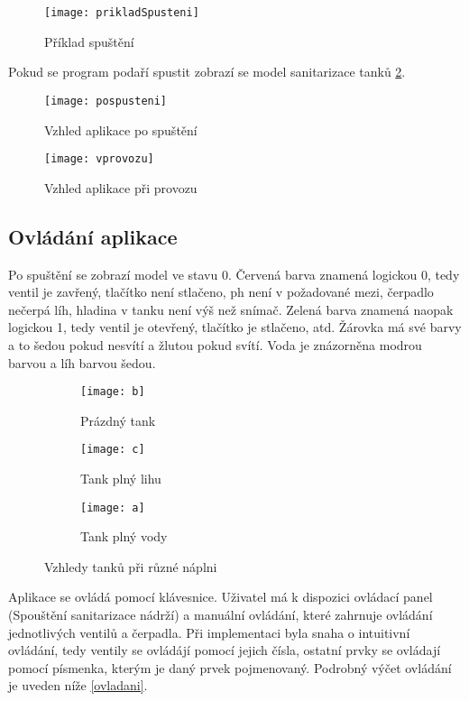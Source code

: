 \documentclass[12pt, a4paper]{article}
\begin{document}
\begin{figure}[h]
\centering 
\texttt{[image: prikladSpusteni]}
\caption{Příklad spuštění}
\label{spusteni}
\end{figure}

Pokud se program podaří spustit zobrazí se model sanitarizace tanků \ref{vzhled}.

\begin{figure}[h]
\centering 
\texttt{[image: pospusteni]}
\caption{Vzhled aplikace po spuštění}
\label{vzhled}
\end{figure}

\begin{figure}[h]
\centering 
\texttt{[image: vprovozu]}
\caption{Vzhled aplikace při provozu}
\end{figure}

\subsection{Ovládání aplikace}
Po spuštění se zobrazí model ve stavu 0. Červená barva znamená logickou 0, tedy ventil je zavřený, tlačítko není stlačeno, ph není v požadované mezi, čerpadlo nečerpá líh, hladina v tanku není výš než snímač. Zelená barva znamená naopak logickou 1, tedy ventil je otevřený, tlačítko je stlačeno, atd. Žárovka má své barvy a to šedou pokud nesvítí a žlutou pokud svítí. Voda je znázorněna modrou barvou a líh barvou šedou.

\begin{figure}[h]
\centering
\begin{subfigure}{0.3\textwidth}
    \texttt{[image: b]}
    \caption{Prázdný tank}
\end{subfigure}
\hfill
\begin{subfigure}{0.3\textwidth}
    \texttt{[image: c]}
    \caption{Tank plný lihu}
\end{subfigure}
\hfill
\begin{subfigure}{0.3\textwidth}
    \texttt{[image: a]}
    \caption{Tank plný vody}
\end{subfigure}
        
\caption{Vzhledy tanků při různé náplni}
\end{figure}

Aplikace se ovládá pomocí klávesnice. Uživatel má k dispozici ovládací panel (Spouštění sanitarizace nádrží) a manuální ovládání, které zahrnuje ovládání jednotlivých ventilů a čerpadla. Při implementaci byla snaha o intuitivní ovládání, tedy ventily se ovládájí pomocí jejich čísla, ostatní prvky se ovládají pomocí písmenka, kterým je daný prvek pojmenovaný. Podrobný výčet ovládání je uveden níže \ref{ovladani}.
\end{document}
